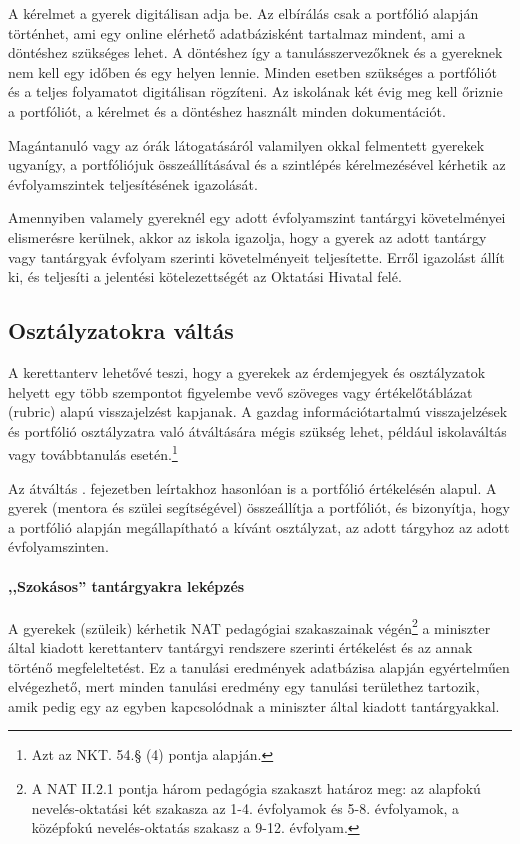 A kérelmet a gyerek digitálisan adja be.
Az elbírálás csak a portfólió alapján történhet, ami egy
online elérhető adatbázisként tartalmaz mindent, ami a döntéshez szükséges
lehet. A döntéshez így a tanulásszervezőknek és a gyereknek nem
kell egy időben és egy helyen lennie. Minden esetben szükséges a portfóliót és
a teljes folyamatot digitálisan rögzíteni.
Az iskolának két évig meg kell őriznie a portfóliót, a kérelmet és a döntéshez
használt minden dokumentációt.

Magántanuló vagy az órák látogatásáról valamilyen okkal
felmentett gyerekek ugyanígy, a portfóliójuk összeállításával és a szintlépés
kérelmezésével kérhetik az évfolyamszintek teljesítésének igazolását.

Amennyiben valamely gyereknél egy adott évfolyamszint tantárgyi követelményei
elismerésre kerülnek, akkor az iskola igazolja, hogy a gyerek az adott tantárgy
vagy tantárgyak évfolyam szerinti követelményeit teljesítette.
Erről igazolást állít ki, és teljesíti a jelentési kötelezettségét az Oktatási
Hivatal felé.

\subsection{Osztályzatokra váltás}
\label{sec:osztalyzatok}
A kerettanterv lehetővé teszi, hogy a gyerekek az érdemjegyek
és osztályzatok
helyett egy több szempontot figyelembe vevő szöveges vagy értékelőtáblázat
(rubric) alapú visszajelzést kapjanak.
A gazdag információtartalmú visszajelzések és portfólió osztályzatra való
átváltására mégis szükség lehet, például iskolaváltás vagy továbbtanulás
esetén.\footnote{Azt az NKT. 54.§ (4) pontja alapján.}

Az átváltás .
fejezetben leírtakhoz
hasonlóan is a portfólió értékelésén alapul.
A gyerek (mentora és szülei segítségével) összeállítja a portfóliót, és
bizonyítja, hogy a portfólió alapján megállapítható a kívánt osztályzat, az
adott tárgyhoz az adott évfolyamszinten.

\paragraph{,,Szokásos'' tantárgyakra leképzés}
A gyerekek (szüleik) kérhetik NAT pedagógiai szakaszainak
végén\footnote{A NAT II.2.1 pontja három pedagógia szakaszt határoz meg: az
      alapfokú nevelés-oktatási két szakasza az 1-4. évfolyamok és 5-8.
      évfolyamok,
      a középfokú nevelés-oktatás szakasz a 9-12. évfolyam.}
a miniszter
által kiadott kerettanterv tantárgyi rendszere szerinti értékelést és az annak
történő megfeleltetést. Ez a tanulási eredmények adatbázisa alapján
egyértelműen elvégezhető, mert minden tanulási eredmény egy tanulási területhez
tartozik, amik pedig egy az egyben kapcsolódnak a miniszter által kiadott
tantárgyakkal.
